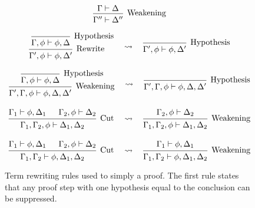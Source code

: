 \begin{figure}[H]
\begin{gather*}
\begin{prooftree}
  \hypo{\Gamma \vdash \Delta}
  \infer1[Weakening]{\Gamma'' \vdash \Delta''}
  \end{prooftree} \\[1em]
  \begin{prooftree}
  \hypo{}
  \infer1[Hypothesis]{\Gamma, \phi \vdash \phi, \Delta}
  \infer1[Rewrite]{\Gamma', \phi \vdash \phi, \Delta'}
  \end{prooftree}
  \quad\leadsto\quad
  \begin{prooftree}
  \hypo{}
  \infer1[Hypothesis]{\Gamma', \phi \vdash \phi, \Delta'}
  \end{prooftree} \\[1em]
  \begin{prooftree}
  \hypo{}
  \infer1[Hypothesis]{\Gamma, \phi \vdash \phi, \Delta}
  \infer1[Weakening]{\Gamma', \Gamma, \phi \vdash \phi, \Delta, \Delta'}
  \end{prooftree}
  \quad\leadsto\quad
  \begin{prooftree}
  \hypo{}
  \infer1[Hypothesis]{\Gamma', \Gamma, \phi \vdash \phi, \Delta, \Delta'}
  \end{prooftree} \\[1em]
  \begin{prooftree}
  \hypo{\Gamma_1 \vdash \phi, \Delta_1}
  \hypo{\Gamma_2, \phi \vdash \Delta_2}
  \infer2[Cut]{\Gamma_1, \Gamma_2, \phi \vdash \Delta_1, \Delta_2}
  \end{prooftree}
  \quad\leadsto\quad
  \begin{prooftree}
  \hypo{\Gamma_2, \phi \vdash \Delta_2}
  \infer1[Weakening]{\Gamma_1, \Gamma_2, \phi \vdash \Delta_1, \Delta_2}
  \end{prooftree} \\[1em]
  \begin{prooftree}
  \hypo{\Gamma_1 \vdash \phi, \Delta_1}
  \hypo{\Gamma_2, \phi \vdash \Delta_2}
  \infer2[Cut]{\Gamma_1, \Gamma_2 \vdash \phi, \Delta_1, \Delta_2}
  \end{prooftree}
  \quad\leadsto\quad
  \begin{prooftree}
  \hypo{\Gamma_1 \vdash \phi, \Delta_1}
  \infer1[Weakening]{\Gamma_1, \Gamma_2 \vdash \phi, \Delta_1, \Delta_2}
  \end{prooftree}
  \end{gather*}
  \caption[Term rewriting rules]{Term rewriting rules used to simply a proof. The first rule states that any proof step with one hypothesis equal to the conclusion can be suppressed.}
  \label{fig:synthesis-simplifications}
\end{figure}
